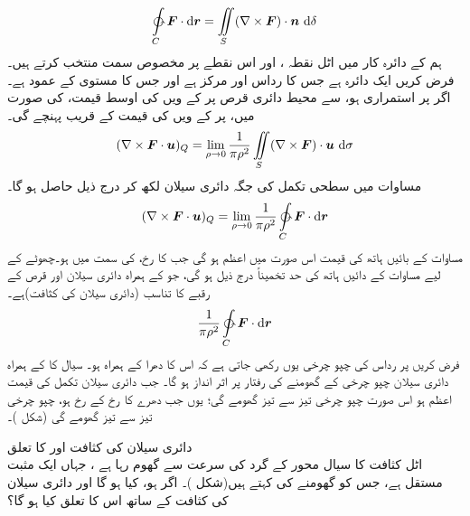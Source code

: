 \begin{align*}
\ointctrclockwise\limits_C \kvec{F}\cdot \dif \kvec{r}=\iint\limits_S (\nabla \times \kvec{F}) \cdot \an\, \dif\delta
\end{align*}
 ہم   کے دائرہ کار میں    اٹل  نقطہ ، اور    اس نقطے پر   مخصوص سمت  منتخب کرتے  ہیں۔  فرض کریں   ایک دائرہ ہے جس کا رداس  اور مرکز  ہے اور جس کا مستوی  کے عمود ہے۔اگر  پر  استمراری ہو،    سے  محیط دائری قرص  پر  کے  ویں  کی اوسط قیمت،   کی صورت میں،     پر  کے  ویں   کی قیمت کے قریب  پہنچے گی۔ 
\begin{align}\label{مساوات_سٹوکس_ایک_عنصر}
(\nabla \times \kvec{F} \cdot \kvec{u})_Q=\lim_{\rho\to 0}\frac{1}{\pi \rho^2}\iint\limits_S (\nabla \times \kvec{F}) \cdot \kvec{u}\, \dif\sigma
\end{align}
مساوات   میں سطحی تکمل کی جگہ دائری سیلان لکھ کر درج ذیل حاصل ہو گا۔
\begin{align}\label{مساوات_سٹوکس_نقطہ_کیو}
(\nabla \times \kvec{F} \cdot \kvec{u})_Q=\lim_{\rho \to 0}\frac{1}{\pi \rho^2}\ointctrclockwise\limits_C \kvec{F}\cdot \dif \kvec{r}
\end{align}
مساوات      کے بائیں ہاتھ کی قیمت اس صورت  میں اعظم  ہو گی جب  کا رخ،  کی سمت میں ہو۔چھوٹے  کے لیے مساوات    کے دائیں ہاتھ   کی حد تخمیناً درج ذیل ہو گی، جو   کے ہمراہ دائری سیلان اور قرص کے رقبے کا  تناسب      (دائری سیلان کی کثافت)ہے۔
\begin{align*}
\frac{1}{\pi \rho^2}\ointctrclockwise\limits_C \kvec{F}\cdot \dif \kvec{r}
\end{align*}
فرض کریں  پر رداس  کی چپو چرخی یوں  رکھی جاتی ہے کہ اس کا دھرا    کے ہمراہ ہو۔ سیال کا  کے ہمراہ دائری سیلان  چپو چرخی کے   گھومنے کی رفتار پر اثر انداز ہو گا۔ جب  دائری سیلان تکمل کی قیمت اعظم  ہو اس صورت چپو چرخی تیز سے تیز گھومے گی؛ یوں  جب دھرے کا رخ   کے رخ ہو، چپو چرخی تیز سے تیز گھومے گی (شکل )۔


   دائری سیلان  کی کثافت اور  کا تعلق\\
اٹل کثافت کا سیال محور  کے گرد  کی   سرعت سے گھوم رہا ہے ، جہاں  ایک مثبت  مستقل ہے،  جس کو گھومنے  کی کہتے ہیں(شکل )۔  اگر  ہو،   کیا ہو گا اور دائری سیلان  کی کثافت کے ساتھ اس کا تعلق کیا ہو گا؟

